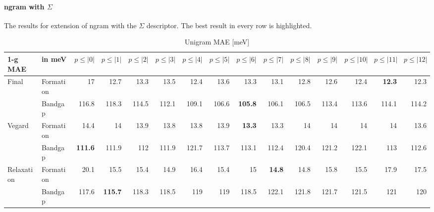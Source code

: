 \documentclass[11pt,oneside,czech,american]{book} %
\theoremstyle{definition} %
\theoremstyle{definition}
\begin{document}
\paragraph{ngram with $\Sigma$}
The results for extension of ngram with the $\Sigma$ descriptor. The best result in every row is highlighted.
\begin{table}[H]
	\scriptsize
	\centering
\begin{tabular}{llrrrrrrrrrrrrr}
	\hline
	1-g MAE    & in meV    &   $p{\leq}|0|$ &   $p{\leq}|1|$ &   $p{\leq}|2|$ &   $p{\leq}|3|$ &   $p{\leq}|4|$ &   $p{\leq}|5|$ &   $p{\leq}|6|$ &   $p{\leq}|7|$ &   $p{\leq}|8|$ &   $p{\leq}|9|$ &   $p{\leq}|10|$ &   $p{\leq}|11|$ &   $p{\leq}|12|$ \\
	\hline
	\multirow{2}{*}{Final}      & Formation &       17   &       12.7 &       13.3 &       13.5 &       12.4 &       13.6 &       13.3 &       13.1 &       12.8 &       12.6 &        12.4 &        \textbf{12.3} &        12.3\\
	      & Bandgap   &      116.8 &      118.3 &      114.5 &      112.1 &      109.1 &      106.6 &      \textbf{105.8} &      106.1 &      106.5 &      113.4 &       113.6 &       114.1 &       114.2\\
	\multirow{2}{*}{Vegard}     & Formation &       14.4 &       14   &       13.9 &       13.8 &       13.8 &       13.9 &       \textbf{13.3} &       13.3 &       14   &       14   &        14   &        14   &        13.6\\
	     & Bandgap   &      \textbf{111.6} &      111.9 &      112   &      111.9 &      121.7 &      113.7 &      113.1 &      112.4 &      120.4 &      121.2 &       122.1 &       113   &       112.6\\
	\multirow{2}{*}{Relaxation} & Formation &       20.1 &       15.5 &       15.4 &       14.9 &       16.4 &       15.4 &       15  &       \textbf{14.8} &       14.8 &       15.8 &        15.5 &        17.9 &        17.5 \\
	 & Bandgap   &      117.6 &      \textbf{115.7} &      118.3 &      118.5 &      119   &      119   &      118.5 &      122.1 &      121.8 &      121.7 &       121.5 &       121   &       120 \\
	\hline
\end{tabular}
\caption{Unigram MAE [meV]}
\label{1-g MAE}
\end{table}
\end{document}
